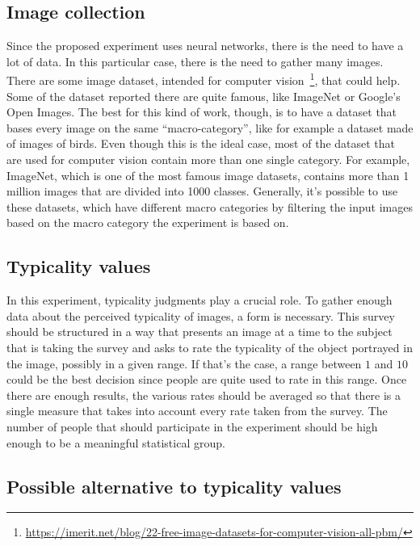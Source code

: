 \documentclass[conference]{IEEEtran}
\begin{document}
		\subsection{Image collection}
			
			\noindent Since the proposed experiment uses neural networks, there is the need to have a lot of data. In this particular case, there is the need to gather many images. There are some image dataset, intended for computer 
			vision~\footnote{\url{https://imerit.net/blog/22-free-image-datasets-for-computer-vision-all-pbm/}}, that could help. Some of the dataset reported there are quite famous, like ImageNet or Google's Open Images. The 
			best for this kind of work, though, is to have a dataset that bases every image on the same ``macro-category'', like for example a dataset made of images of birds. Even though this is the ideal case,
			most of the dataset that are used for computer vision contain more than one single category. For example, ImageNet, which is one of the most famous image datasets, contains more than 1 million images that are divided 
			into 1000 classes. Generally, it's possible to use these datasets, which have different macro categories by filtering the input images based on the macro category the experiment is based on.
		
		\subsection{Typicality values\label{sec:typval}}
			
			\noindent In this experiment, typicality judgments play a crucial role. To gather enough data about the perceived typicality of images, a form is necessary. This survey should be structured in a way that presents an 
			image at a time to the subject that is taking the survey and asks to rate the typicality of the object portrayed in the image, possibly in a given range. If that's the case, a range between $1$ and $10$ 
			could be the best decision since people are quite used to rate in this range. Once there are enough results, the various rates should be averaged so that there is a single measure that takes into 
			account every rate taken from the survey. The number of people that should participate in the experiment should be high enough to be a meaningful statistical group.
			
			
		\subsection{Possible alternative to typicality values\label{sec:patv}}
		
\end{document}
